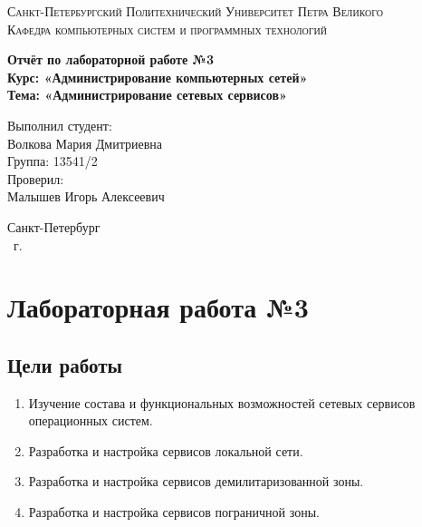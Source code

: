 \documentclass[14pt,a4paper,report]{report}
\begin{document}
\def\contentsname{Содержание}

\begin{titlepage}
	\begin{center}
		\textsc{Санкт-Петербургский Политехнический 
			Университет Петра Великого\\[5mm]
			Кафедра компьютерных систем и программных технологий}
		
		\vfill
		
		\textbf{Отчёт по лабораторной работе №3\\[3mm]
			Курс: «Администрирование компьютерных сетей»\\[3mm]
			Тема: «Администрирование сетевых сервисов»\\[35mm]
			}
	\end{center}
	
	\hfill
	\begin{minipage}{.5\textwidth}
		Выполнил студент:\\[2mm] 
		Волкова Мария Дмитриевна\\
		Группа: 13541/2\\[5mm]
		
		Проверил:\\[2mm] 
		Малышев Игорь Алексеевич
	\end{minipage}
	\vfill
	\begin{center}
		Санкт-Петербург\\ \the\year\ г.
	\end{center}
\end{titlepage}

\tableofcontents
\clearpage

\chapter{Лабораторная работа №3}
\section{Цели работы}
\begin{enumerate}
\item Изучение состава и функциональных возможностей сетевых сервисов операционных систем.
\item Разработка и настройка сервисов локальной сети.
\item Разработка и настройка сервисов демилитаризованной зоны.
\item Разработка и настройка сервисов пограничной зоны.
\end{enumerate}
\end{document}

